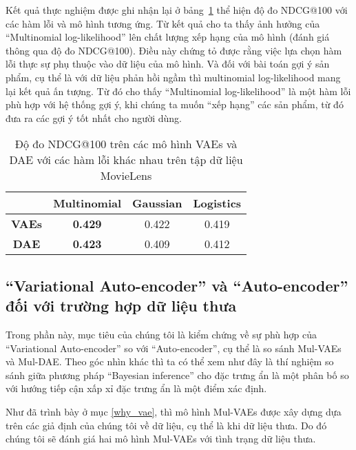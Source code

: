     Kết quả thực nghiệm được ghi nhận lại ở bảng~\ref{table:comparell} thể hiện độ đo NDCG@100 với các hàm lỗi và mô hình tương ứng. 
    Từ kết quả cho ta thấy ảnh hưởng của ``Multinomial log-likelihood'' lên chất lượng xếp hạng của mô hình (đánh giá thông qua độ đo NDCG@100). 
    Điều này chứng tỏ được rằng việc lựa chọn hàm lỗi thực sự phụ thuộc vào dữ liệu của mô hình. 
    Và đối với bài toán gợi ý sản phẩm, cụ thể là với dữ liệu phản hồi ngầm thì multinomial log-likelihood mang lại kết quả ấn tượng. 
    Từ đó cho thấy ``Multinomial log-likelihood'' là một hàm lỗi phù hợp với hệ thống gợi ý, khi chúng ta muốn ``xếp hạng'' các sản phẩm, từ đó đưa ra các gợi ý tốt nhất cho người dùng.            

    \begin{table}[]
    \centering
        \begin{tabular}{|c|c|c|c|}
        \hline
                        & \textbf{Multinomial}                  & \textbf{Gaussian}            & \textbf{Logistics}           \\ \hline
        \textbf{VAEs} &  \textbf{0.429} & 0.422 &  0.419 \\ \hline
        \textbf{DAE}  & \textbf{0.423}                        & 0.409                        & 0.412                        \\ \hline
        \end{tabular}
    
    \caption[]{Độ đo NDCG@100 trên các mô hình VAEs và DAE với các hàm lỗi khác nhau trên tập dữ liệu MovieLens}
    \label{table:comparell}
    \end{table}



    \subsection{``Variational Auto-encoder'' và ``Auto-encoder'' đối với trường hợp dữ liệu thưa}
    Trong phần này, mục tiêu của  chúng tôi là kiểm chứng về sự phù hợp của ``Variational Auto-encoder'' so với ``Auto-encoder'', cụ thể là so sánh Mul-VAEs và Mul-DAE.
    Theo góc nhìn khác thì ta có thể xem như đây là thí nghiệm so sánh giữa phương pháp ``Bayesian inference'' cho đặc trưng ẩn là một phân bố so với hướng tiếp cận xấp xỉ đặc trưng ẩn là một điểm xác định.

    Như đã trình bày ở mục \ref{why_vae}, thì mô hình Mul-VAEs được xây dựng dựa trên các giả định của chúng tôi về dữ liệu, cụ thể là khi dữ liệu thưa.
    Do đó chúng tôi sẽ đánh giá hai mô hình Mul-VAEs với tình trạng dữ liệu thưa.

